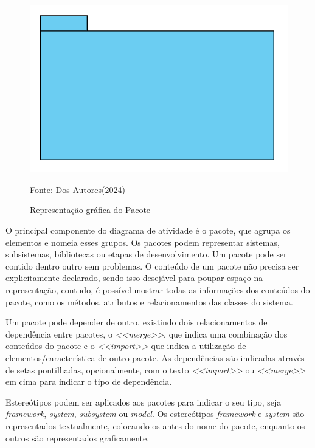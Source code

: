 \documentclass[12pt,openright,oneside,a4paper,
	chapter=TITLE,
	section=TITLE,
	english,brazil]{abntex2}
\begin{document}
\begin{figure}
	\caption{Representação gráfica do Pacote}
	\centering
	\includegraphics[scale=0.5]{img/Pacote.png}
	\\

	\label{ElementoPacote}
	\footnotesize\raggedright Fonte: Dos Autores(2024)
\end{figure}

O principal componente do diagrama de atividade é o pacote, que agrupa os elementos e nomeia esses grupos. Os pacotes podem representar sistemas, subsistemas, bibliotecas ou etapas de desenvolvimento. Um pacote pode ser contido dentro outro sem problemas. O conteúdo de um pacote não precisa ser explicitamente declarado, sendo isso desejável para poupar espaço na representação, contudo, é possível mostrar todas as informações dos conteúdos do pacote, como os métodos, atributos e relacionamentos das classes do sistema.

Um pacote pode depender de outro, existindo dois relacionamentos de dependência entre pacotes, o \textit{<<merge>>}, que indica uma combinação dos conteúdos do pacote  e o \textit{<<import>>} que indica a utilização de elementos/característica de outro pacote.  As dependências são indicadas através de setas pontilhadas, opcionalmente, com o texto \textit{<<import>>} ou \textit{<<merge>>} em cima para indicar o tipo de dependência.

Estereótipos podem ser aplicados aos pacotes para indicar o seu tipo, seja \textit{framework}, \textit{system}, \textit{subsystem} ou \textit{model}. Os estereótipos \textit{framework} e \textit{system} são representados textualmente, colocando-os antes do nome do pacote, enquanto os outros são representados graficamente.
\end{document}
